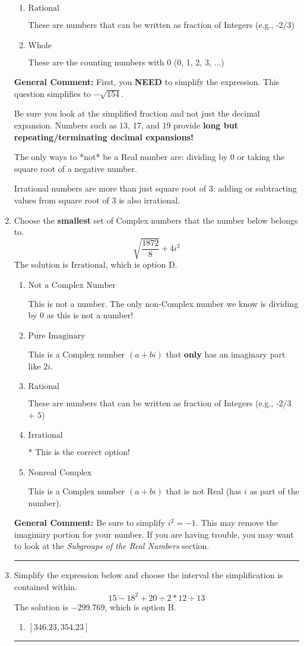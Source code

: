 \documentclass{extbook}[14pt]
\newcommand{\litem}[1]{\item #1

\rule{\textwidth}{0.4pt}}
\begin{document}
\begin{enumerate}
{\begin{enumerate}[label=\Alph*.]
* This is the correct option!
\item \( \text{Rational} \)

These are numbers that can be written as fraction of Integers (e.g., -2/3)
\item \( \text{Whole} \)

These are the counting numbers with 0 (0, 1, 2, 3, ...)
\end{enumerate}

\textbf{General Comment:} First, you \textbf{NEED} to simplify the expression. This question simplifies to $-\sqrt{154}$. 
 
 Be sure you look at the simplified fraction and not just the decimal expansion. Numbers such as 13, 17, and 19 provide \textbf{long but repeating/terminating decimal expansions!} 
 
 The only ways to *not* be a Real number are: dividing by 0 or taking the square root of a negative number. 
 
 Irrational numbers are more than just square root of 3: adding or subtracting values from square root of 3 is also irrational.
}
\litem{
Choose the \textbf{smallest} set of Complex numbers that the number below belongs to.
\[ \sqrt{\frac{1872}{8}}+4i^2 \]The solution is \( \text{Irrational} \), which is option D.\begin{enumerate}[label=\Alph*.]
\item \( \text{Not a Complex Number} \)

This is not a number. The only non-Complex number we know is dividing by 0 as this is not a number!
\item \( \text{Pure Imaginary} \)

This is a Complex number $(a+bi)$ that \textbf{only} has an imaginary part like $2i$.
\item \( \text{Rational} \)

These are numbers that can be written as fraction of Integers (e.g., -2/3 + 5)
\item \( \text{Irrational} \)

* This is the correct option!
\item \( \text{Nonreal Complex} \)

This is a Complex number $(a+bi)$ that is not Real (has $i$ as part of the number).
\end{enumerate}

\textbf{General Comment:} Be sure to simplify $i^2 = -1$. This may remove the imaginary portion for your number. If you are having trouble, you may want to look at the \textit{Subgroups of the Real Numbers} section.
}
\litem{
Simplify the expression below and choose the interval the simplification is contained within.
\[ 15 - 18^2 + 20 \div 2 * 12 \div 13 \]The solution is \( -299.769 \), which is option B.\begin{enumerate}[label=\Alph*.]
\item \( [346.23, 354.23] \)


\end{enumerate}}
\end{enumerate}
\end{document}
